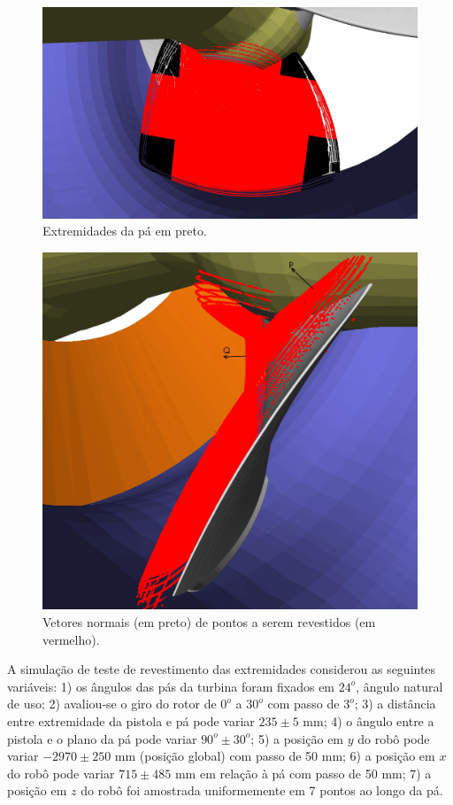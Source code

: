 \begin{figure}[!ht]
	\centering	
	\includegraphics[width=0.7\columnwidth]{method/figs/tocoat.jpg}
	\caption{Extremidades da pá em preto.}
	\label{fig::extremidades}
\end{figure}

\begin{figure}[!ht]
	\centering	
	\includegraphics[width=0.7\columnwidth]{method/figs/normal.png}
	\caption{Vetores normais (em preto) de pontos a serem revestidos (em
	vermelho).}
	\label{fig::normal}
\end{figure}

A simulação de teste de revestimento das extremidades considerou as seguintes
variáveis: 1) os ângulos das pás da turbina foram fixados em $24^o$, ângulo
natural de uso; 2) avaliou-se o giro do rotor de $0^o$ a $30^o$ com passo de
$3^o$; 3) a distância entre extremidade da pistola e pá pode variar $235 \pm 5$
mm; 4) o ângulo entre a pistola e o plano da pá pode variar $90^o \pm 30^o$; 5)
a posição em $y$ do robô pode variar $-2970 \pm 250$ mm (posição global) com
passo de 50 mm; 6) a posição em $x$ do robô pode variar $715 \pm 485$ mm em
relação à pá com passo de 50 mm; 7) a posição em $z$ do robô foi amostrada
uniformemente em 7 pontos ao longo da pá.

